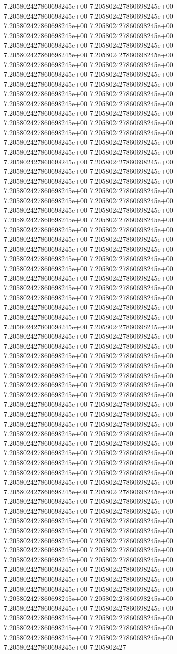 7.205802427860698245e+00	7.205802427860698245e+00	7.205802427860698245e+00	7.205802427860698245e+00	7.205802427860698245e+00	7.205802427860698245e+00	7.205802427860698245e+00	7.205802427860698245e+00	7.205802427860698245e+00	7.205802427860698245e+00	7.205802427860698245e+00	7.205802427860698245e+00	7.205802427860698245e+00	7.205802427860698245e+00	7.205802427860698245e+00	7.205802427860698245e+00	7.205802427860698245e+00	7.205802427860698245e+00	7.205802427860698245e+00	7.205802427860698245e+00	7.205802427860698245e+00	7.205802427860698245e+00	7.205802427860698245e+00	7.205802427860698245e+00	7.205802427860698245e+00	7.205802427860698245e+00	7.205802427860698245e+00	7.205802427860698245e+00	7.205802427860698245e+00	7.205802427860698245e+00	7.205802427860698245e+00	7.205802427860698245e+00	7.205802427860698245e+00	7.205802427860698245e+00	7.205802427860698245e+00	7.205802427860698245e+00	7.205802427860698245e+00	7.205802427860698245e+00	7.205802427860698245e+00	7.205802427860698245e+00	7.205802427860698245e+00	7.205802427860698245e+00	7.205802427860698245e+00	7.205802427860698245e+00	7.205802427860698245e+00	7.205802427860698245e+00	7.205802427860698245e+00	7.205802427860698245e+00	7.205802427860698245e+00	7.205802427860698245e+00	7.205802427860698245e+00	7.205802427860698245e+00	7.205802427860698245e+00	7.205802427860698245e+00	7.205802427860698245e+00	7.205802427860698245e+00	7.205802427860698245e+00	7.205802427860698245e+00	7.205802427860698245e+00	7.205802427860698245e+00	7.205802427860698245e+00	7.205802427860698245e+00	7.205802427860698245e+00	7.205802427860698245e+00	7.205802427860698245e+00	7.205802427860698245e+00	7.205802427860698245e+00	7.205802427860698245e+00	7.205802427860698245e+00	7.205802427860698245e+00	7.205802427860698245e+00	7.205802427860698245e+00	7.205802427860698245e+00	7.205802427860698245e+00	7.205802427860698245e+00	7.205802427860698245e+00	7.205802427860698245e+00	7.205802427860698245e+00	7.205802427860698245e+00	7.205802427860698245e+00	7.205802427860698245e+00	7.205802427860698245e+00	7.205802427860698245e+00	7.205802427860698245e+00	7.205802427860698245e+00	7.205802427860698245e+00	7.205802427860698245e+00	7.205802427860698245e+00	7.205802427860698245e+00	7.205802427860698245e+00	7.205802427860698245e+00	7.205802427860698245e+00	7.205802427860698245e+00	7.205802427860698245e+00	7.205802427860698245e+00	7.205802427860698245e+00	7.205802427860698245e+00	7.205802427860698245e+00	7.205802427860698245e+00	7.205802427860698245e+00	7.205802427860698245e+00	7.205802427860698245e+00	7.205802427860698245e+00	7.205802427860698245e+00	7.205802427860698245e+00	7.205802427860698245e+00	7.205802427860698245e+00	7.205802427860698245e+00	7.205802427860698245e+00	7.205802427860698245e+00	7.205802427860698245e+00	7.205802427860698245e+00	7.205802427860698245e+00	7.205802427860698245e+00	7.205802427860698245e+00	7.205802427860698245e+00	7.205802427860698245e+00	7.205802427860698245e+00	7.205802427860698245e+00	7.205802427860698245e+00	7.205802427860698245e+00	7.205802427860698245e+00	7.205802427860698245e+00	7.205802427860698245e+00	7.205802427860698245e+00	7.205802427860698245e+00	7.205802427860698245e+00	7.205802427860698245e+00	7.205802427860698245e+00	7.205802427860698245e+00	7.205802427860698245e+00	7.205802427860698245e+00	7.205802427860698245e+00	7.205802427